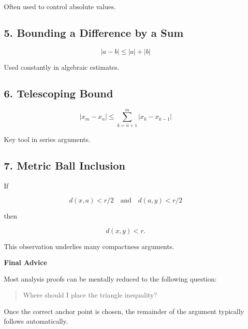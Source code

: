 Often used to control absolute values.

\bigskip

\subsection*{5. Bounding a Difference by a Sum}

\[
|a-b|
\le
|a|+|b|
\]

Used constantly in algebraic estimates.

\bigskip

\subsection*{6. Telescoping Bound}

\[
|x_m-x_n|
\le
\sum_{k=n+1}^{m} |x_k-x_{k-1}|
\]

Key tool in series arguments.

\bigskip

\subsection*{7. Metric Ball Inclusion}

If

\[
d(x,a)<r/2
\quad\text{and}\quad
d(a,y)<r/2
\]

then

\[
d(x,y)<r.
\]

This observation underlies many compactness arguments.

\bigskip

\begin{center}
\textbf{Final Advice}
\end{center}

Most analysis proofs can be mentally reduced to the following question:

\begin{quote}
Where should I place the triangle inequality?
\end{quote}

Once the correct anchor point is chosen, the remainder of the argument
typically follows automatically.